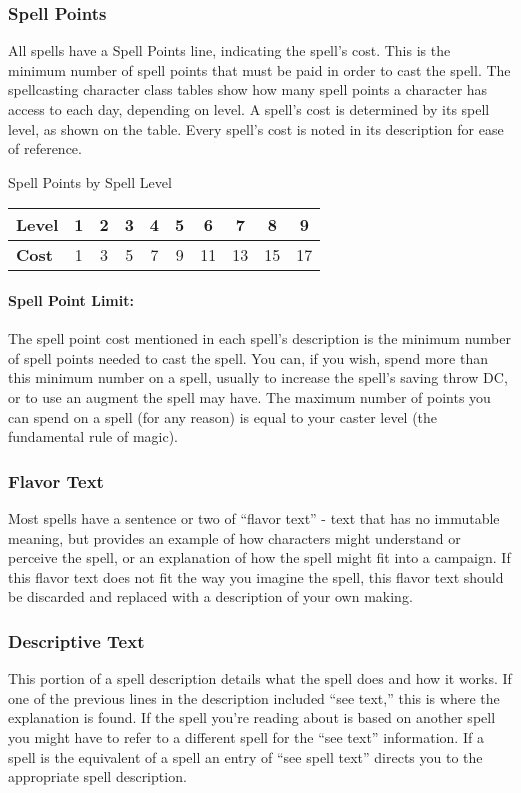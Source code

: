\documentclass[../VancianToPsionics.tex]{subfiles}
\begin{document}
\subsubsection{Spell Points}
All spells have a Spell Points line, indicating the spell's cost. This is the minimum number of spell points that must be paid in order to cast the spell.
The spellcasting character class tables show how many spell points a character has access to each day, depending on level.
A spell's cost is determined by its spell level, as shown on the  table. 
Every spell's cost is noted in its description for ease of reference.

\begin{tableonecolumn}
\caption{Spell Points by Spell Level}
\label{tab:SpellPointsBySpellLevel}
\begin{tabular}{l*{9}{c}}
\toprule
\textbf{Level}&1&2&3&4&5&6&7&8&9\\
\midrule
\textbf{Cost}&1&3&5&7&9&11&13&15&17\\
\bottomrule
\end{tabular}
\end{tableonecolumn}


\paragraph{Spell Point Limit:} 
The spell point cost mentioned in each spell's description is the minimum number of spell points needed to cast the spell. 
You can, if you wish, spend more than this minimum number on a spell, usually to increase the spell's saving throw DC, or to use an augment the spell may have.
The maximum number of points you can spend on a spell (for any reason) is equal to your caster level (the fundamental rule of magic).

\subsubsection{Flavor Text}
Most spells have a sentence or two of ``flavor text'' - text that has no immutable meaning, but provides an example of how characters might understand or perceive the spell, or an explanation of how the spell might fit into a campaign.
If this flavor text does not fit the way you imagine the spell, this flavor text should be discarded and replaced with a description of your own making.

\subsubsection{Descriptive Text}
This portion of a spell description details what the spell does and how it works. If one of the previous lines in the description included ``see text,'' this is where the explanation is found. If the spell you're reading about is based on another spell you might have to refer to a different spell for the “see text” information. If a spell is the equivalent of a spell an entry of “see spell text” directs you to the appropriate spell description.
\end{document}
